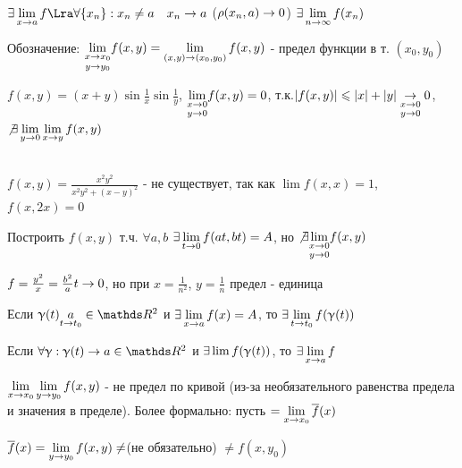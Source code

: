 \documentclass[12pt, fleqn]{article}
\begin{document}
\begin{upr}
    $\e \lim\limits_{x \ra a} f \Lra \forall \{x_n\}: x_n \neq a \q x_n \ra a$ ($\rho(x_n,a) \rightarrow 0$) $\exists \lim\limits_{n \rightarrow \infty} f(x_n)$
\end{upr}

Обозначение: $\underset{y \rightarrow y_0}{\lim\limits_{x \rightarrow x_0}} f(x,y) = \lim\limits_{(x,y) \rightarrow (x_0,y_0)} f(x,y)$ - предел функции в т. $(x_0,y_0)$

\begin{example}
    $f(x,y)=(x+y)\sin \frac{1}{x} \sin \frac{1}{y}$, $\underset{y \rightarrow 0}{\lim\limits_{x \rightarrow 0}} f(x,y) = 0$, т.к.$|f(x,y)| \leqslant |x|+|y| \underset{y \rightarrow 0}{\underset{x \rightarrow 0}{\rightarrow}} 0$, $\not \exists \lim\limits_{y \rightarrow 0} \lim\limits_{x \rightarrow y} f(x,y)$
\end{example}

\begin{example}\\
    $f(x,y)=\frac{x^2 y^2}{x^2 y^2 + (x-y)^2}$ - не существует, так как $\lim f(x,x)=1$, $f(x,2x)=0$
\end{example}

\begin{example}
    Построить $f(x,y)$ т.ч. $\forall a,b$ $\exists \lim\limits_{t \rightarrow 0} f(at,bt)=A$, но $\not \exists \underset{y \rightarrow 0}{\lim\limits_{x \rightarrow 0}} f(x,y)$
    
    $f=\frac{y^2}{x}=\frac{b^2}{a} t \rightarrow 0$, но при $x=\frac{1}{n^2}$, $y=\frac{1}{n}$ предел - единица
\end{example}

\begin{remark}
    Если $\upgamma(t) \us{t \ra t_0}{a} \in \R^2$ и $\exists \lim\limits_{x \rightarrow a} f(x)=A$, то $\exists \lim\limits_{t \rightarrow t_0} f(\upgamma(t))$
\end{remark}

\begin{remark}
    Если $\forall \upgamma: \upgamma(t) \ra a \in \R^2$ и $\exists \lim f(\upgamma(t))$, то $\exists \lim\limits_{x \rightarrow a} f$
\end{remark}

\begin{remark}
    $\lim\limits_{x \rightarrow x_0} \lim\limits_{y \rightarrow y_0} f(x,y)$ - не предел по кривой (из-за необязательного равенства предела и значения в пределе). Более формально: пусть $=\lim\limits_{x \rightarrow x_0} \overline{f}(x)$
    
    $\overline{f}(x)=\lim\limits_{y \rightarrow y_0} f(x,y) \neq$(не обязательно) $\neq f(x,y_0)$
\end{remark}
\end{document}
